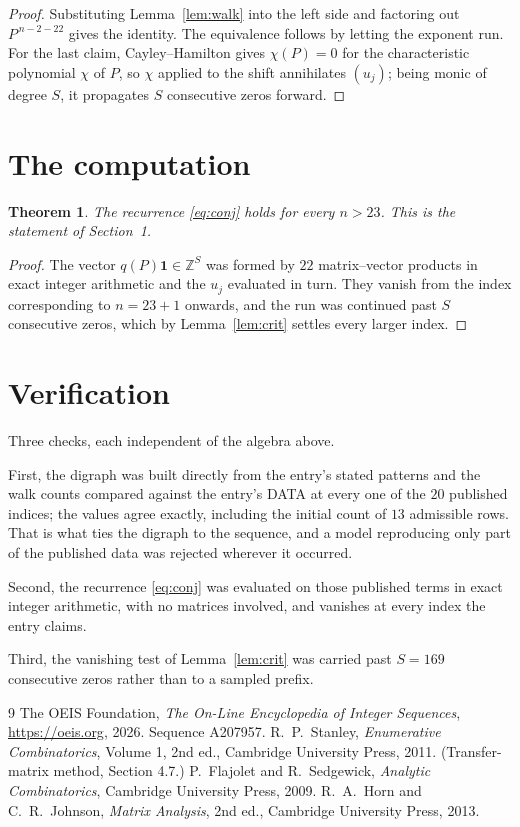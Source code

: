 \documentclass[11pt,a4paper]{article}
\theoremstyle{plain}
\newtheorem{theorem}{Theorem}
\theoremstyle{definition}
\begin{document}
\begin{proof}
Substituting Lemma~\ref{lem:walk} into the left side and factoring out
$P^{\,n-2-22}$ gives the identity. The equivalence follows by letting the exponent
run. For the last claim, Cayley--Hamilton gives $\chi(P)=0$ for the characteristic
polynomial $\chi$ of $P$, so $\chi$ applied to the shift annihilates $(u_j)$; being monic of
degree $S$, it propagates $S$ consecutive zeros forward.
\end{proof}

\section{The computation}

\begin{theorem}
The recurrence \eqref{eq:conj} holds for every $n>23$. This is the statement of
Section~1.
\end{theorem}

\begin{proof}
The vector $q(P)\mathbf{1}\in\mathbb{Z}^{S}$ was formed by $22$ matrix--vector
products in exact integer arithmetic and the $u_j$ evaluated in turn. They vanish from the
index corresponding to $n=23+1$ onwards, and the run was continued past $S$ consecutive
zeros, which by Lemma~\ref{lem:crit} settles every larger index.
\end{proof}

\section{Verification}

Three checks, each independent of the algebra above.

First, the digraph was built directly from the entry's stated patterns and the walk counts
compared against the entry's DATA at every one of the $20$ published indices; the
values agree exactly, including the initial count of $13$ admissible rows. That is
what ties the digraph to the sequence, and a model reproducing only part of the published
data was rejected wherever it occurred.

Second, the recurrence \eqref{eq:conj} was evaluated on those published terms in exact
integer arithmetic, with no matrices involved, and vanishes at every index the entry claims.

Third, the vanishing test of Lemma~\ref{lem:crit} was carried past $S=169$ consecutive
zeros rather than to a sampled prefix.

\begin{thebibliography}{9}
 The OEIS Foundation, \emph{The On-Line Encyclopedia of Integer
Sequences}, \url{https://oeis.org}, 2026. Sequence A207957.
 R.~P.~Stanley, \emph{Enumerative Combinatorics}, Volume 1, 2nd ed.,
Cambridge University Press, 2011. (Transfer-matrix method, Section 4.7.)
 P.~Flajolet and R.~Sedgewick, \emph{Analytic Combinatorics}, Cambridge
University Press, 2009.
 R.~A.~Horn and C.~R.~Johnson, \emph{Matrix Analysis}, 2nd ed., Cambridge
University Press, 2013.
\end{thebibliography}
\end{document}
